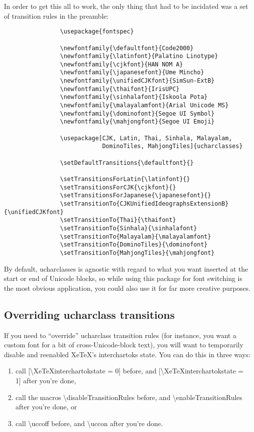 \documentclass{article}
\newenvironment{numberlist}{%
  \begin{enumerate}
	\setlength{\itemsep}{0pt}
	\setlength{\parsep}{0pt}
	\setlength{\topsep}{0pt}
	\setlength{\partopsep}{0pt}
	\setlength{\parskip}{0pt}
	\setlength{\labelsep}{5pt}}%
{
  \end{enumerate}}
\begin{document}
		In order to get this all to work, the only thing that had to be incidated was a set of transition rules in the preamble:

		\disableTransitionRules
		\begin{verbatim}
				\usepackage{fontspec}

				\newfontfamily{\defaultfont}{Code2000}
				\newfontfamily{\latinfont}{Palatino Linotype}
				\newfontfamily{\cjkfont}{HAN NOM A}
				\newfontfamily{\japanesefont}{Ume Mincho}
				\newfontfamily{\unifiedCJKfont}{SimSun-ExtB}
				\newfontfamily{\thaifont}{IrisUPC}
				\newfontfamily{\sinhalafont}{Iskoola Pota}
				\newfontfamily{\malayalamfont}{Arial Unicode MS}
				\newfontfamily{\dominofont}{Segoe UI Symbol}
				\newfontfamily{\mahjongfont}{Segoe UI Emoji}

				\usepackage[CJK, Latin, Thai, Sinhala, Malayalam,
				            DominoTiles, MahjongTiles]{ucharclasses}

				\setDefaultTransitions{\defaultfont}{}

				\setTransitionsForLatin{\latinfont}{}
				\setTransitionsForCJK{\cjkfont}{}
				\setTransitionsForJapanese{\japanesefont}{}
				\setTransitionTo{CJKUnifiedIdeographsExtensionB}{\unifiedCJKfont}
				\setTransitionTo{Thai}{\thaifont}
				\setTransitionTo{Sinhala}{\sinhalafont}
				\setTransitionTo{Malayalam}{\malayalamfont}
				\setTransitionTo{DominoTiles}{\dominofont}
				\setTransitionTo{MahjongTiles}{\mahjongfont}
		\end{verbatim}
		\enableTransitionRules

		By default, ucharclasses is agnostic with regard to what you want inserted at the start or end of Unicode blocks, so while using this package for font switching is the most obvious application, you could also use it for far more creative purposes.

		\subsection{Overriding ucharclass transitions}

			If you need to “override” ucharclass transition rules (for instance, you want a custom font for a bit of cross-Unicode-block text), you will want to temporarily disable and reenabled XeTeX's interchartoks state. You can do this in three ways:

			\begin{numberlist}
				\item call [\textbackslash XeTeXinterchartokstate = 0] before, and [\textbackslash XeTeXinterchartokstate = 1] after you're done,
				\item call the macros \textbackslash disableTransitionRules before, and \textbackslash enableTransitionRules after you're done, or
				\item call \textbackslash uccoff before, and \textbackslash uccon after you're done.
			\end{numberlist}
\end{document}
